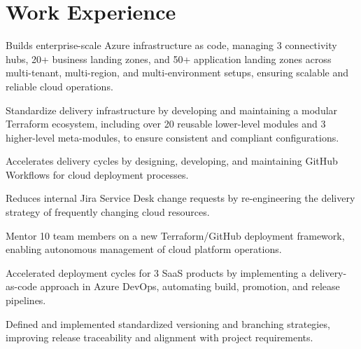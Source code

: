 \documentclass[11pt]{deedy-resume-openfont}
\begin{document}
\section{Work Experience}
\sectionsepsmall
{}\hfill {}
\begin{tightemize}
	\item Builds enterprise-scale Azure infrastructure as code, managing 3 connectivity hubs, 20+ business landing zones, and 50+ application landing zones across multi-tenant, multi-region, and multi-environment setups, ensuring scalable and reliable cloud operations.
	\item Standardize delivery infrastructure by developing and maintaining a modular Terraform ecosystem, including over 20 reusable lower-level modules and 3 higher-level meta-modules, to ensure consistent and compliant configurations.
	\item Accelerates delivery cycles by designing, developing, and maintaining GitHub Workflows for cloud deployment processes.
	\item Reduces internal Jira Service Desk change requests by re-engineering the delivery strategy of frequently changing cloud resources.
	\item Mentor 10 team members on a new Terraform/GitHub deployment framework, enabling autonomous management of cloud platform operations.
\end{tightemize}
\sectionsep
{}
\sectionsep
{}\hfill {}
\begin{tightemize}
	\item Accelerated deployment cycles for 3 SaaS products by implementing a delivery-as-code approach in Azure DevOps, automating build, promotion, and release pipelines.
	\item Defined and implemented standardized versioning and branching strategies, improving release traceability and alignment with project requirements.
\end{tightemize}
\sectionsep
{}
\sectionsep
%
%
\newpage
{}\hfill {}
\end{document}
